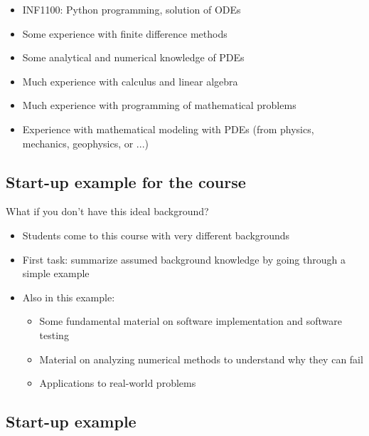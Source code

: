 \documentclass[%
oneside,                 %
final,                   %
10pt]{article}
\begin{document}
\begin{itemize}
 \item INF1100: Python programming, solution of ODEs

 \item Some experience with finite difference methods

 \item Some analytical and numerical knowledge of PDEs

 \item Much experience with calculus and linear algebra

 \item Much experience with programming of mathematical problems

 \item Experience with mathematical modeling with PDEs
   (from physics, mechanics, geophysics, or ...)
\end{itemize}

\noindent
\subsection*{Start-up example for the course}

What if you don't have this ideal background?

\begin{itemize}
 \item Students come to this course with very different backgrounds

 \item First task: summarize assumed background knowledge by going through
   a simple example

 \item Also in this example:
\begin{itemize}

   \item Some fundamental material on software implementation
     and software testing

   \item Material on analyzing numerical methods to understand
     why they can fail

   \item Applications to real-world problems
\end{itemize}

\noindent
\end{itemize}

\noindent
\subsection*{Start-up example}
\end{document}
